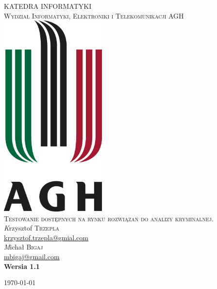 \begin{titlepage}
\begin{center}

\textsc{\Huge KATEDRA INFORMATYKI}\\[1.0cm]
\textsc{\LARGE Wydział Informatyki, Elektroniki i Telekomunikacji AGH}\\[1.0cm]
\includegraphics[width=0.4\textwidth]{./Obrazy/logo}~\\[1cm]

\textsc{\Large Testowanie dostępnych na rynku rozwiązań do analizy kryminalnej.}\\[1.0cm]

\emph Krzysztof \textsc{Trzepla} \\
\href{mailto:krzysztof.trzepla@gmail.com}{krzysztof.trzepla@gmial.com} \\
\emph Michał \textsc{Bigaj} \\ 
\href{mailto:mbigaj@gmail.com}{mbigaj@gmail.com} \\[0.5cm]
\textbf{Wersia 1.1}

\vfill
{\large \today}

\end{center}
\end{titlepage}
